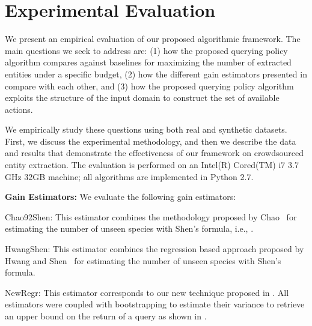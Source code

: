 

\section{Experimental Evaluation}
\label{sec:exps}
We present an empirical evaluation of our proposed algorithmic framework. The main questions we seek to address are: (1) how the proposed querying policy algorithm compares against baselines for maximizing the number of extracted entities under a specific budget, (2) how the different gain estimators presented in  compare with each other, and (3) how the proposed querying policy algorithm exploits the structure of the input domain to construct the set of available actions.

We empirically study these questions using both real and synthetic datasets. First, we discuss the experimental methodology, and then we describe the data and results that demonstrate the effectiveness of our framework on crowdsourced entity extraction. The evaluation is performed on an Intel(R) Cored(TM) i7 3.7 GHz 32GB machine; all algorithms are implemented in Python 2.7. 

\vspace{5pt}\noindent\textbf{Gain Estimators:} We evaluate the following gain estimators:
\squishlist
\item Chao92Shen: This estimator combines the methodology proposed by Chao~\cite{chao:1992} for estimating the number of unseen species  with Shen's formula, i.e., .
\item HwangShen: This estimator combines the regression based approach proposed by Hwang and Shen~\cite{hwang:2010} for estimating the number of unseen species with Shen's formula. 
\item NewRegr: This estimator corresponds to our new technique proposed in .
\squishend
All estimators were coupled with bootstrapping to estimate their variance to retrieve an upper bound on the return of a query as shown in .


